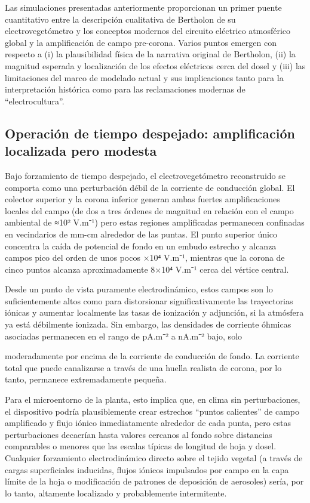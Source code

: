 \documentclass[
]{article}
\begin{document}
Las simulaciones presentadas anteriormente proporcionan un primer puente
cuantitativo entre la descripción cualitativa de Bertholon de su
electrovegetómetro y los conceptos modernos del circuito eléctrico
atmosférico global y la amplificación de campo pre-corona. Varios puntos
emergen con respecto a (i) la plausibilidad física de la narrativa
original de Bertholon, (ii) la magnitud esperada y localización de los
efectos eléctricos cerca del dosel y (iii) las limitaciones del marco de
modelado actual y sus implicaciones tanto para la interpretación
histórica como para las reclamaciones modernas de ``electrocultura''.

\subsection{Operación de tiempo despejado: amplificación localizada pero
modesta}\label{operaciuxf3n-de-tiempo-despejado-amplificaciuxf3n-localizada-pero-modesta}

Bajo forzamiento de tiempo despejado, el electrovegetómetro reconstruido
se comporta como una perturbación débil de la corriente de conducción
global. El colector superior y la corona inferior generan ambas fuertes
amplificaciones locales del campo (de dos a tres órdenes de magnitud en
relación con el campo ambiental de ≈10² V.m⁻¹) pero estas regiones
amplificadas permanecen confinadas en vecindarios de mm-cm alrededor de
las puntas. El punto superior único concentra la caída de potencial de
fondo en un embudo estrecho y alcanza campos pico del orden de unos
pocos ×10⁴ V.m⁻¹, mientras que la corona de cinco puntos alcanza
aproximadamente 8×10⁴ V.m⁻¹ cerca del vértice central.

Desde un punto de vista puramente electrodinámico, estos campos son lo
suficientemente altos como para distorsionar significativamente las
trayectorias iónicas y aumentar localmente las tasas de ionización y
adjunción, si la atmósfera ya está débilmente ionizada. Sin embargo, las
densidades de corriente óhmicas asociadas permanecen en el rango de
pA.m⁻² a nA.m⁻² bajo, solo

moderadamente por encima de la corriente de conducción de fondo. La
corriente total que puede canalizarse a través de una huella realista de
corona, por lo tanto, permanece extremadamente pequeña.

Para el microentorno de la planta, esto implica que, en clima sin
perturbaciones, el dispositivo podría plausiblemente crear estrechos
``puntos calientes'' de campo amplificado y flujo iónico inmediatamente
alrededor de cada punta, pero estas perturbaciones decaerían hasta
valores cercanos al fondo sobre distancias comparables o menores que las
escalas típicas de longitud de hoja y dosel. Cualquier forzamiento
electrodinámico directo sobre el tejido vegetal (a través de cargas
superficiales inducidas, flujos iónicos impulsados por campo en la capa
límite de la hoja o modificación de patrones de deposición de aerosoles)
sería, por lo tanto, altamente localizado y probablemente intermitente.
\end{document}
